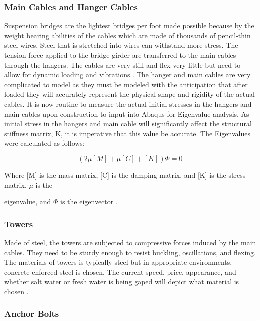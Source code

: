 \subsubsection{Main Cables and Hanger Cables}

Suspension bridges are the lightest bridges per foot made possible because by the weight bearing abilities of the cables which are made of thousands of
pencil-thin steel wires. Steel that is stretched into wires can withstand more stress. The tension force applied to the bridge girder are transferred to
the main cables through the hangers. The cables are very still and flex very little but need to allow for dynamic loading and vibrations \cite{Manoj}.
The hanger and main cables are very complicated to model as they must be modeled with the anticipation that after loaded they will accurately represent
the physical shape and rigidity of the actual cables. It is now routine to measure the actual initial stresses in the hangers and main cables upon
construction to input into Abaqus for Eigenvalue analysis. As initial stress in the hangers and main cable will significantly affect the structural
stiffness matrix, K, it is imperative that this value be accurate. The Eigenvalues were calculated as follows: 


\begin{equation}
( 2 \mu [M] + \mu [C] + [K]) {\Phi} = 0
\label{eqn:Euler}
\end{equation}

Where [M] is the mass matrix, [C] is the damping matrix, and [K] is the stress matrix, $\mu$ is the 

eigenvalue, and $\Phi$ is the eigenvector \cite{Manoj}. 

\subsubsection{Towers}

Made of steel, the towers are subjected to compressive forces induced by the main cables. They need to be sturdy enough to resist buckling, oscillations,
and flexing. The materials of towers is typically steel but in appropriate environments, concrete enforced steel is chosen. The current speed, price,
appearance, and whether salt water or fresh water is being gaped will depict what material is chosen \cite{Manoj}. 


\subsubsection{Anchor Bolts}

